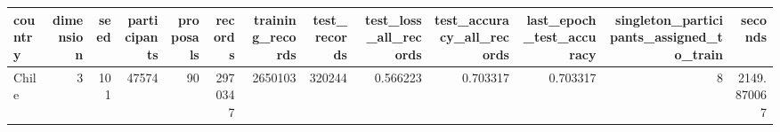 \begin{tabular}{lrrrrrrrrrrrr}
\toprule
country & dimension & seed & participants & proposals & records & training_records & test_records & test_loss_all_records & test_accuracy_all_records & last_epoch_test_accuracy & singleton_participants_assigned_to_train & seconds \\
\midrule
Chile & 3 & 101 & 47574 & 90 & 2970347 & 2650103 & 320244 & 0.566223 & 0.703317 & 0.703317 & 8 & 2149.870067 \\
\bottomrule
\end{tabular}
